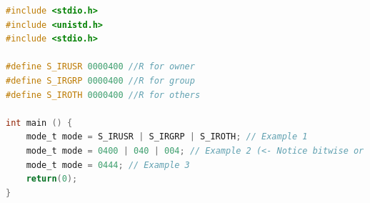\documentclass[12pt]{article}
\begin{document}
\begin{itemize}
\begin{itemize}
\begin{lstlisting}[language=c]
#include <stdio.h>
#include <unistd.h>
#include <stdio.h>

#define S_IRUSR 0000400 //R for owner
#define S_IRGRP 0000400 //R for group
#define S_IROTH 0000400 //R for others

int main () {
    mode_t mode = S_IRUSR | S_IRGRP | S_IROTH; // Example 1
    mode_t mode = 0400 | 040 | 004; // Example 2 (<- Notice bitwise or is used)
    mode_t mode = 0444; // Example 3
    return(0);
}
\end{lstlisting}
    \end{itemize}
\end{itemize}
\end{document}
